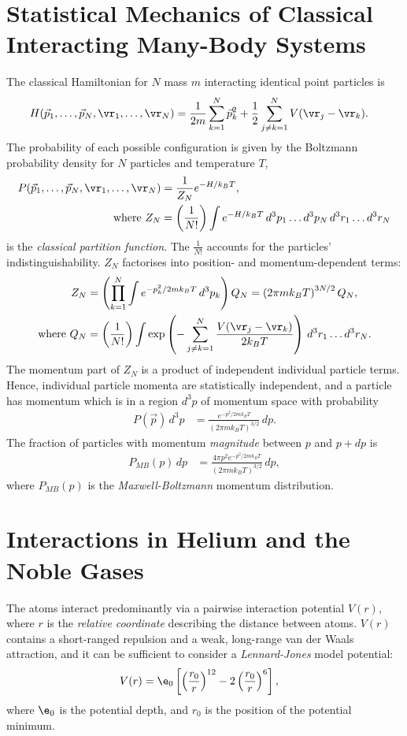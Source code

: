 \documentclass[a4paper, 11pt, normalem]{report}
\begin{document}
\section{Statistical Mechanics of Classical Interacting Many-Body Systems}
The classical Hamiltonian for $N$ mass $m$ interacting identical point particles is
\begin{align}
    H(\vec{p}_1,\dots,\vec{p}_N,\vr_1,\dots,\vr_N) &= \frac{1}{2m}\sum_{k=1}^N \vec{p}_k^2 + \frac12\sum_{j\neq k=1}^N V(\vr_j-\vr_k).
\end{align}
The probability of each possible configuration is given by the Boltzmann probability density for $N$ particles and temperature $T$,
\begin{align}
    P(\vec{p}_1,\dots,\vec{p}_N,\vr_1,\dots,\vr_N) &= \frac{1}{Z_N}e^{-H/k_BT}, \\
    \text{where } Z_N &= \left(\frac{1}{N!}\right)\int e^{-H/k_BT}\,d^3p_1\dots d^3p_N\,d^3r_1\dots d^3r_N
\end{align}
is the \emph{classical partition function}.
The $\frac{1}{N!}$ accounts for the particles' indistinguishability.
$Z_N$ factorises into position- and momentum-dependent terms:
\begin{align}
    Z_N &= \left(\prod_{k=1}^N \int e^{-p_k^2/2mk_BT}\,d^3p_k\right)Q_N = \left(2\pi mk_BT\right)^{3N/2}Q_N, \\
    \text{where } Q_N &= \left(\frac{1}{N!}\right)\int \exp\left(-\sum_{j\neq k=1}^N \frac{V(\vr_j-\vr_k)}{2k_BT}\right)\,d^3r_1\dots d^3r_N.
\end{align}
The momentum part of $Z_N$ is a product of independent individual particle terms.
Hence, individual particle momenta are statistically independent, and a particle has momentum which is in a region $d^3p$ of momentum space with probability
\begin{align}
    P(\vec{p})\,d^3p &= \frac{e^{-p^2/2mk_BT}}{(2\pi mk_BT)^{3/2}}\,dp.
\end{align}
The fraction of particles with momentum \emph{magnitude} between $p$ and $p+dp$ is
\begin{align}
    P_{MB}(p)\,dp &= \frac{4\pi p^2e^{-p^2/2mk_BT}}{(2\pi mk_BT)^{3/2}}\,dp,
\end{align}
where $P_{MB}(p)$ is the \emph{Maxwell-Boltzmann} momentum distribution.

\section{Interactions in Helium and the Noble Gases}
The atoms interact predominantly via a pairwise interaction potential $V(r)$, where $r$ is the \emph{relative coordinate} describing the distance between atoms.
$V(r)$ contains a short-ranged repulsion and a weak, long-range van der Waals attraction, and it can be sufficient to consider a \emph{Lennard-Jones} model potential:
\begin{align}
    V(r) &= \e_0\left[\left(\frac{r_0}{r}\right)^{12}-2\left(\frac{r_0}{r}\right)^6\right],
\end{align}
where $\e_0$ is the potential depth, and $r_0$ is the position of the potential minimum.
\end{document}
